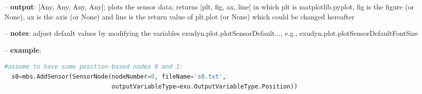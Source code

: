\begin{itemize}[leftmargin=0.7cm]
\begin{itemize}[leftmargin=1.2cm]
\item[]{\it sizeInches}: given as list [sizeX, sizeY] with the sizes per (sub)plot given in inches; default: [6.4, 4.8]; in case of sub plots, the total size of the figure is computed from nx*sizeInches[0] and ny*sizeInches[1]
\item[]{\it fileName}: if this string is non-empty, figure will be saved to given path and filename (use figName.pdf to safe as PDF or figName.png to save as PNG image); use matplotlib.use('Agg') in order not to open figures if you just want to save them
\item[]{\it useXYZcomponents}: of True, it will use X, Y and Z for sensor components, e.g., measuring Position, Velocity, etc. wherever possible
\item[]{\it closeAll}: if True, close all figures before opening new one (do this only in first PlotSensor command!)
\item[]{\it [*kwargs]}:
\item[]{\it minorTicksXon}: if True, turn minor ticks for x-axis on
\item[]{\it minorTicksYon}: if True, turn minor ticks for y-axis on
\item[]{\it logScaleX}: use log scale for x-axis
\item[]{\it logScaleY}: use log scale for y-axis
\item[]{\it fileCommentChar}: if exists, defines the comment character in files (\#, %
\item[]{\it fileDelimiterChar}: if exists, defines the character indicating the columns for data (',', ' ', ';', ...)
\end{itemize}
\item[--]
{\bf output}: [Any, Any, Any, Any]; plots the sensor data; returns [plt, fig, ax, line] in which plt is matplotlib.pyplot, fig is the figure (or None), ax is the axis (or None) and line is the return value of plt.plot (or None) which could be changed hereafter
\item[--]
{\bf notes}: adjust default values by modifying the variables exudyn.plot.plotSensorDefault..., e.g., exudyn.plot.plotSensorDefaultFontSize
\item[--]
{\bf example}: \vspace{-12pt}\ei\begin{lstlisting}[language=Python, xleftmargin=36pt]
  #assume to have some position-based nodes 0 and 1:
  s0=mbs.AddSensor(SensorNode(nodeNumber=0, fileName='s0.txt',
                              outputVariableType=exu.OutputVariableType.Position))

\end{lstlisting}
\end{itemize}
